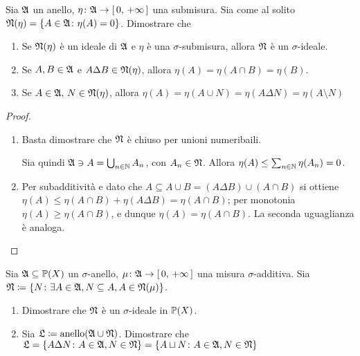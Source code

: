 \documentclass[../EserciziIstituzioniAnalisi.tex]{subfiles}
\begin{document}
\begin{exercise}[2016-10-20]
  Sia $\mathfrak A$ un anello, $\eta\colon\mathfrak A\to\left[\,0,\,+\infty\,\right]$ una submisura. Sia come al solito $\mathfrak N(\eta)=\left\{A\in\mathfrak A\colon\eta(A)=0\right\}$. Dimostrare che
  \begin{enumerate}
    \item Se $\mathfrak N(\eta)$ è un ideale di $\mathfrak A$ e $\eta$ è una $\sigma$-submisura, allora $\mathfrak N$ è un $\sigma$-ideale.
    \item Se $A,B\in \mathfrak A$ e $A\Delta B\in \mathfrak N(\eta)$, allora $\eta(A)=\eta(A\cap B)=\eta(B)$.
    \item Se $A\in \mathfrak A,\, N\in \mathfrak N(\eta)$, allora $\eta(A)=\eta(A\cup N)=\eta(A\Delta N)=\eta(A\setminus N)$
  \end{enumerate}
\end{exercise}
\begin{proof}
  \begin{enumerate}
    \item Basta dimostrare che $\mathfrak N$ è chiuso per unioni numeribaili.

    Sia quindi $\mathfrak A\ni A=\bigcup_{n\in\mathbb N}A_n$, con $A_n\in\mathfrak N$. Allora $\eta(A)\leq\sum_{n\in\mathbb N}\eta(A_n)=0$.
    \item Per subadditività e dato che $A\subseteq A\cup B=(A\Delta B)\cup (A\cap B)$ si ottiene $\eta(A)\leq\eta(A\cap B)+\eta(A\Delta B)=\eta(A\cap B)$; per monotonia $\eta(A)\geq\eta(A\cap B)$, e dunque $\eta(A)=\eta(A\cap B)$. La seconda uguaglianza è analoga. 
  \end{enumerate}
\end{proof}
\begin{exercise}[2016-10-20]
  Sia $\mathfrak A\subseteq\mathbb P(X)$ un $\sigma$-anello, $\mu\colon \mathfrak A\to\left[\,0,\,+\infty\,\right]$ una misura $\sigma$-additiva.
  Sia $\mathfrak N\coloneqq\left\{N\colon\exists A\in \mathfrak A, N\subseteq A, A\in \mathfrak N(\mu)\right\}$.

  \begin{enumerate}
    \item Dimostrare che $\mathfrak N$ è un $\sigma$-ideale in $\mathbb P(X)$.
    \item Sia $\mathfrak L\coloneqq\operatorname{anello}(\mathfrak A\cup\mathfrak N)$. Dimostrare che $\mathfrak L=\left\{A\Delta N\colon A\in\mathfrak A,N\in\mathfrak N\right\}=\left\{A\sqcup N\colon A\in\mathfrak A,N\in\mathfrak N\right\}$ 
  \end{enumerate}
\end{exercise}
\end{document}
